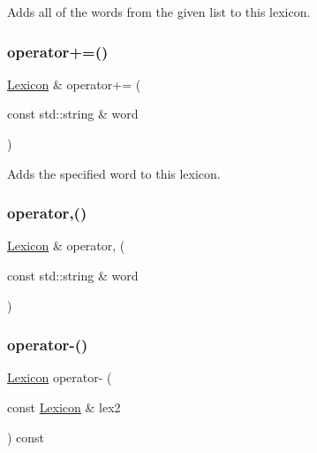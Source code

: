 Adds all of the words from the given list to this lexicon. 

\mbox{\label{classLexicon_a051f30ebfa7b8fbb7ea1dc5af23d3004}} 
\subsubsection{\texorpdfstring{operator+=()}{operator+=()}\hspace{0.1cm}{\footnotesize\ttfamily [3/3]}}
{\footnotesize\ttfamily \mbox{\hyperlink{classLexicon}{Lexicon}} \& operator+= (\begin{DoxyParamCaption}\item[{const std\+::string \&}]{word }\end{DoxyParamCaption})}



Adds the specified word to this lexicon. 

\mbox{\label{classLexicon_a75f32eb2f65c3c3968193cfd72bdfd1a}} 
\subsubsection{\texorpdfstring{operator,()}{operator,()}}
{\footnotesize\ttfamily \mbox{\hyperlink{classLexicon}{Lexicon}} \& operator, (\begin{DoxyParamCaption}\item[{const std\+::string \&}]{word }\end{DoxyParamCaption})}

\mbox{\label{classLexicon_a487624601a6357e1b6d64053f9ebb5e2}} 
\subsubsection{\texorpdfstring{operator-\/()}{operator-()}\hspace{0.1cm}{\footnotesize\ttfamily [1/3]}}
{\footnotesize\ttfamily \mbox{\hyperlink{classLexicon}{Lexicon}} operator-\/ (\begin{DoxyParamCaption}\item[{const \mbox{\hyperlink{classLexicon}{Lexicon}} \&}]{lex2 }\end{DoxyParamCaption}) const}



